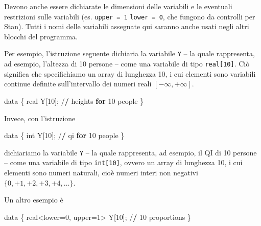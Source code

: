\documentclass[
  10pt,
  italian,
  a4paper,
  extrafontsizes,onecolumn,openright
  ]{memoir}
\newenvironment{Shaded}{\begin{snugshade}}{\end{snugshade}}
\newcommand{\ControlFlowTok}[1]{\textcolor[rgb]{0.13,0.29,0.53}{\textbf{#1}}}
\newcommand{\DecValTok}[1]{\textcolor[rgb]{0.00,0.00,0.81}{#1}}
\newcommand{\ErrorTok}[1]{\textcolor[rgb]{0.64,0.00,0.00}{\textbf{#1}}}
\newcommand{\NormalTok}[1]{#1}
\newcommand{\OtherTok}[1]{\textcolor[rgb]{0.56,0.35,0.01}{#1}}
\newcommand{\SpecialCharTok}[1]{\textcolor[rgb]{0.00,0.00,0.00}{#1}}
\begin{document}
Devono anche essere dichiarate le dimensioni delle variabili e le eventuali restrizioni sulle variabili (es. \texttt{upper\ =\ 1} \texttt{lower\ =\ 0}, che fungono da controlli per Stan). Tutti i nomi delle variabili assegnate qui saranno anche usati negli altri blocchi del programma.

Per esempio, l'istruzione seguente dichiaria la variabile \texttt{Y} -- la quale rappresenta, ad esempio, l'altezza di 10 persone -- come una variabile di tipo \texttt{real{[}10{]}}. Ciò significa che specifichiamo un array di lunghezza 10, i cui elementi sono variabili continue definite sull'intervallo dei numeri reali \([-\infty, +\infty]\).

\begin{Shaded}
\begin{Highlighting}[]
\NormalTok{data \{}
\NormalTok{  real Y[}\DecValTok{10}\NormalTok{]; }\SpecialCharTok{/}\ErrorTok{/}\NormalTok{ heights }\ControlFlowTok{for} \DecValTok{10}\NormalTok{ people}
\NormalTok{\}}
\end{Highlighting}
\end{Shaded}

Invece, con l'istruzione

\begin{Shaded}
\begin{Highlighting}[]
\NormalTok{data \{}
\NormalTok{  int Y[}\DecValTok{10}\NormalTok{]; }\SpecialCharTok{/}\ErrorTok{/}\NormalTok{ qi }\ControlFlowTok{for} \DecValTok{10}\NormalTok{ people}
\NormalTok{\}}
\end{Highlighting}
\end{Shaded}

\noindent
dichiariamo la variabile \texttt{Y} -- la quale rappresenta, ad esempio, il QI di 10 persone -- come una variabile di tipo \texttt{int{[}10{]}}, ovvero un array di lunghezza 10, i cui elementi sono numeri naturali, cioè numeri interi non negativi \(\{0, +1, +2, +3, +4, \dots\}\).

Un altro esempio è

\begin{Shaded}
\begin{Highlighting}[]
\NormalTok{data \{}
\NormalTok{  real}\SpecialCharTok{\textless{}}\NormalTok{lower}\OtherTok{=}\DecValTok{0}\NormalTok{, upper}\OtherTok{=}\DecValTok{1}\SpecialCharTok{\textgreater{}}\NormalTok{ Y[}\DecValTok{10}\NormalTok{]; }\SpecialCharTok{/}\ErrorTok{/} \DecValTok{10}\NormalTok{ proportions}
\NormalTok{\}}
\end{Highlighting}
\end{Shaded}
\end{document}
